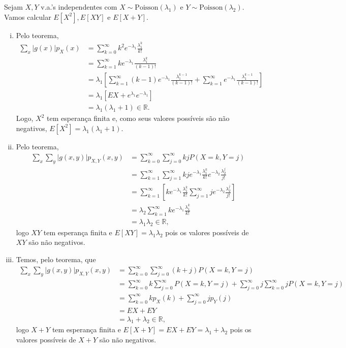\documentclass[../Notas.tex]{subfiles}
\begin{document}
\begin{example}
Sejam $X, Y$ v.a.'s independentes com $X\sim\text{Poisson}(\lambda_1)$ e $Y\sim\text{Poisson}(\lambda_2)$. Vamos calcular $E[X^2], E[XY]$ e $E[X+Y]$.
\begin{enumerate}[(i)]
    \item Pelo teorema,
    \begin{align*}
        \sum_x |g(x)|p_X(x) &= \sum_{k=0}^{\infty} k^2e^{-\lambda_1}\frac{\lambda_1^k}{k!} \\
        &= \sum_{k=1}^{\infty} ke^{-\lambda_1}\frac{\lambda_1^{k}}{(k-1)!} \\
        &= \lambda_1\left[ \sum_{k=1}^{\infty}(k-1)e^{-\lambda_1}\frac{\lambda_1^{k-1}}{(k-1)!} + \sum_{k=1}^{\infty}e^{-\lambda_1}\frac{\lambda_1^{k-1}}{(k-1)!} \right] \\
        &= \lambda_1[EX + e^{\lambda_1}e^{-\lambda_1}] \\
        &= \lambda_1(\lambda_1 + 1)\in\mathbb{R}.
    \end{align*}
    Logo, $X^2$ tem esperança finita e, como seus valores possíveis são não negativos, $E[X^2] = \lambda_1(\lambda_1 + 1)$.
    
    \item Pelo teorema,
    \begin{align*}
        \sum_x\sum_y |g(x,y)|p_{X,Y}(x,y) &= \sum_{k=0}^{\infty}\sum_{j=0}^{\infty}kjP(X=k, Y=j) \\
        &= \sum_{k=1}^{\infty}\sum_{j=1}^{\infty} kje^{-\lambda_1}\frac{\lambda_1^k}{k!}e^{-\lambda_2}\frac{\lambda_2^j}{j!} \\
        &= \sum_{k=1}^{\infty}\left[ ke^{-\lambda_1}\frac{\lambda_1^k}{k!}\sum_{j=1}^{\infty}je^{-\lambda_2}\frac{\lambda_2^j}{j!} \right] \\
        &= \lambda_2\sum_{k=1}^{\infty} ke^{-\lambda_1}\frac{\lambda_1^k}{k!} \\
        &= \lambda_1\lambda_2\in\mathbb{R},
    \end{align*}
    logo $XY$ tem esperança finita e $E[XY] = \lambda_1\lambda_2$ pois os valores possíveis de $XY$ são não negativos.
    
    \item Temos, pelo teorema, que
    \begin{align*}
        \sum_x\sum_y |g(x,y)|p_{X,Y}(x,y) &= \sum_{k=0}^{\infty}\sum_{j=0}^{\infty} (k+j)P(X=k, Y=j) \\
        &= \sum_{k=0}^{\infty}k\sum_{j=0}^{\infty} P(X=k, Y=j) + \sum_{j=0}^{\infty}j\sum_{k=0}^{\infty} jP(X=k, Y=j) \\
        &= \sum_{k=0}^{\infty}kp_X(k) + \sum_{j=0}^{\infty} jp_Y(j) \\
        &= EX + EY \\
        &= \lambda_1 + \lambda_2\in\mathbb{R},
    \end{align*}
    logo $X+Y$ tem esperança finita e $E[X+Y] = EX + EY = \lambda_1 + \lambda_2$ pois os valores possíveis de $X+Y$ são não negativos.
\end{enumerate}
\end{example}
\end{document}
